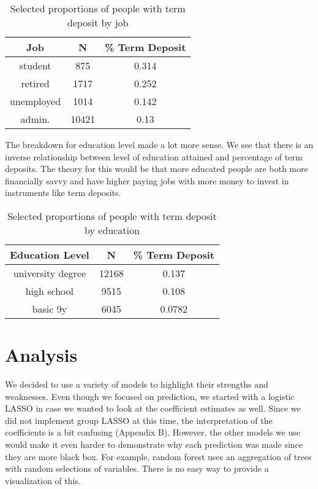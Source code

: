 \documentclass[12pt]{article}
\begin{document}
\begin{table}[h]
\centering
   \begin{tabular}{|c|c|c|}
    \hline
    Job & N & \% Term Deposit \\
    \hline
    student & 875 & 0.314 \\
    \hline
    retired & 1717 & 0.252 \\
    \hline
    unemployed & 1014 & 0.142 \\
    \hline
    admin. & 10421 & 0.13 \\
    \hline
\end{tabular}
\caption{Selected proportions of people with term deposit by job \label{job_td}}
\end{table}

The breakdown for education level made a lot more sense. We see that there is an inverse relationship between level of education attained and percentage of term deposits. The theory for this would be that more educated people are both more financially savvy and have higher paying jobs with more money to invest in instruments like term deposits.

\begin{table}[h]
\centering
   \begin{tabular}{|c|c|c|}
    \hline
    Education Level & N & \% Term Deposit \\
    \hline
    university degree & 12168 & 0.137 \\
    \hline
    high school & 9515 & 0.108 \\
    \hline
    basic 9y & 6045 & 0.0782 \\
    \hline
\end{tabular}
\caption{Selected proportions of people with term deposit by education \label{educ_td}}
\end{table}

\section*{Analysis}
We decided to use a variety of models to highlight their strengths and weaknesses. Even though we focused on prediction, we started with a logistic LASSO in case we wanted to look at the coefficient estimates as well. Since we did not implement group LASSO at this time, the interpretation of the coefficients is a bit confusing (Appendix B). However, the other models we use would make it even harder to demonstrate why each prediction was made since they are more black box. For example, random forest uses an aggregation of trees with random selections of variables. There is no easy way to provide a visualization of this.
\end{document}
